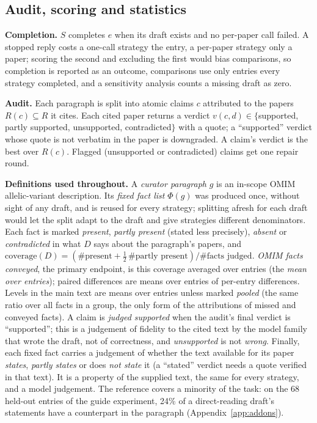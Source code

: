 \documentclass{article} %
\begin{document}
\subsection{Audit, scoring and statistics}
\label{sec:scoring}
\textbf{Completion.} $S$ completes $e$ when its draft exists and no per-paper call failed. A stopped reply costs a one-call strategy the entry, a per-paper strategy only a paper; scoring the second and excluding the first would bias comparisons, so completion is reported as an outcome, comparisons use only entries every strategy completed, and a sensitivity analysis counts a missing draft as zero.

\textbf{Audit.} Each paragraph is split into atomic claims $c$ attributed to the papers $R(c)\subseteq R$ it cites. Each cited paper returns a verdict $v(c,d)\in\{$supported, partly supported, unsupported, contradicted$\}$ with a quote; a ``supported'' verdict whose quote is not verbatim in the paper is downgraded. A claim's verdict is the best over $R(c)$. Flagged (unsupported or contradicted) claims get one repair round.

\textbf{Definitions used throughout.} A \emph{curator paragraph} $g$ is an in-scope OMIM allelic-variant description. Its \emph{fixed fact list} $\Phi(g)$ was produced once, without sight of any draft, and is reused for every strategy; splitting afresh for each draft would let the split adapt to the draft and give strategies different denominators. Each fact is marked \emph{present}, \emph{partly present} (stated less precisely), \emph{absent} or \emph{contradicted} in what $D$ says about the paragraph's papers, and $\text{coverage}(D)=(\#\text{present}+\tfrac12\,\#\text{partly present})/\#\text{facts judged}$. \emph{OMIM facts conveyed}, the primary endpoint, is this coverage averaged over entries (the \emph{mean over entries}); paired differences are means over entries of per-entry differences. Levels in the main text are means over entries unless marked \emph{pooled} (the same ratio over all facts in a group, the only form of the attributions of missed and conveyed facts). A claim is \emph{judged supported} when the audit's final verdict is ``supported''; this is a judgement of fidelity to the cited text by the model family that wrote the draft, not of correctness, and \emph{unsupported} is not \emph{wrong}. Finally, each fixed fact carries a judgement of whether the text available for its paper \emph{states}, \emph{partly states} or does \emph{not state} it (a ``stated'' verdict needs a quote verified in that text). It is a property of the supplied text, the same for every strategy, and a model judgement. The reference covers a minority of the task: on the 68 held-out entries of the guide experiment, 24\% of a direct-reading draft's statements have a counterpart in the paragraph (Appendix~\ref{app:addons}).
\end{document}

